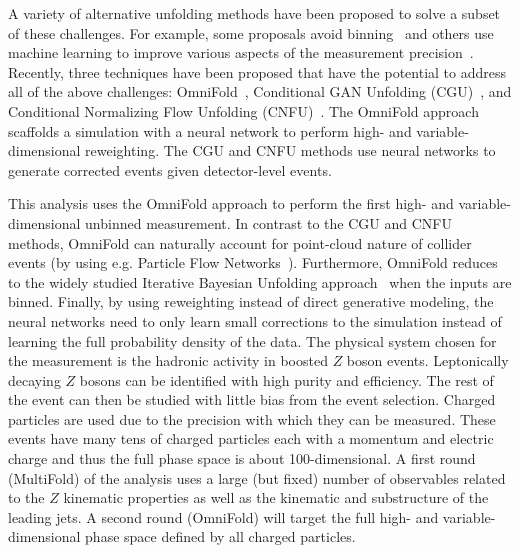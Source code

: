 A variety of alternative unfolding methods have been proposed to solve a subset of these challenges.   For example, some proposals avoid binning~\cite{Glazov:2017vni,Datta:2018mwd,Lindemann:1995ut,Aslan:2003vu} and others use machine learning to improve various aspects of the measurement precision~\cite{Gagunashvili:2010zw,Glazov:2017vni,Datta:2018mwd}.  Recently, three techniques have been proposed that have the potential to address all of the above challenges: OmniFold~\cite{1911.09107}, Conditional GAN Unfolding (CGU)~\cite{Bellagente:2019uyp}, and Conditional Normalizing Flow Unfolding (CNFU)~\cite{Bellagente:2020piv}.   The OmniFold approach scaffolds a simulation with a neural network to perform high- and variable-dimensional reweighting.  The CGU and CNFU methods use neural networks to generate corrected events given detector-level events.

This analysis uses the OmniFold approach to perform the first high- and variable-dimensional unbinned measurement.  In contrast to the CGU and CNFU methods, OmniFold can naturally account for point-cloud nature of collider events (by using e.g. Particle Flow Networks~\cite{Komiske:2018cqr}).  Furthermore, OmniFold reduces to the widely studied Iterative Bayesian Unfolding approach~\cite{DAGOSTINI1995487} when the inputs are binned.  Finally, by using reweighting instead of direct generative modeling, the neural networks need to only learn small corrections to the simulation instead of learning the full probability density of the data.   The physical system chosen for the measurement is the hadronic activity in boosted $Z$ boson events.  Leptonically decaying $Z$ bosons can be identified with high purity and efficiency.  The rest of the event can then be studied with little bias from the event selection.  Charged particles are used due to the precision with which they can be measured.  These events have many tens of charged particles each with a momentum and electric charge and thus the full phase space is about 100-dimensional.  A first round (MultiFold) of the analysis uses a large (but fixed) number of observables related to the $Z$ kinematic properties as well as the kinematic and substructure of the leading jets.  A second round (OmniFold) will target the full high- and variable-dimensional phase space defined by all charged particles.

